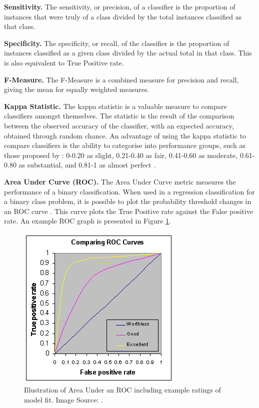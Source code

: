 \textbf{Sensitivity.}
The sensitivity, or precision, of a classifier is the proportion of instances that were truly of a class divided by the total instances classified as that class.

\textbf{Specificity.}
The specificity, or recall, of the classifier is the proportion of instances classified as a given class divided by the actual total in that class. This is also equivalent to True Positive rate.

\textbf{F-Measure.} The F-Measure is a combined measure for precision and recall, giving the mean for equally weighted measures.

\textbf{Kappa Statistic.}
The kappa statistic is a valuable measure to compare classifiers amongst themselves. The statistic is the result of the comparison between the observed accuracy of the classifier, with an expected accuracy, obtained through random chance. An advantage of using the kappa statistic to compare classifiers is the ability to categorise into performance groups, such as those proposed by \citeauthor{Landis1977}: 0-0.20 as slight, 0.21-0.40 as fair, 0.41-0.60 as moderate, 0.61-0.80 as substantial, and 0.81-1 as almost perfect \cite{Landis1977}.

\textbf{Area Under Curve (ROC).}
The Area Under Curve metric measures the performance of a binary classification. When used in a regression classification for a binary class problem, it is possible to plot the probability threshold changes in an ROC curve \cite{Metz1978}. This curve plots the True Positive rate against the False positive rate. An example ROC graph is presented in Figure \ref{fig: auc-roc-example}.

\begin{figure}[h]
    \centering
        \includegraphics[scale=3, angle=0]{Files/treatment-study-1/figures/auc-roc-example}
        \caption{Illustration of Area Under an ROC including example ratings of model fit. Image Source:  \cite{Tape}.}
        \label{fig: auc-roc-example}
\end{figure}

